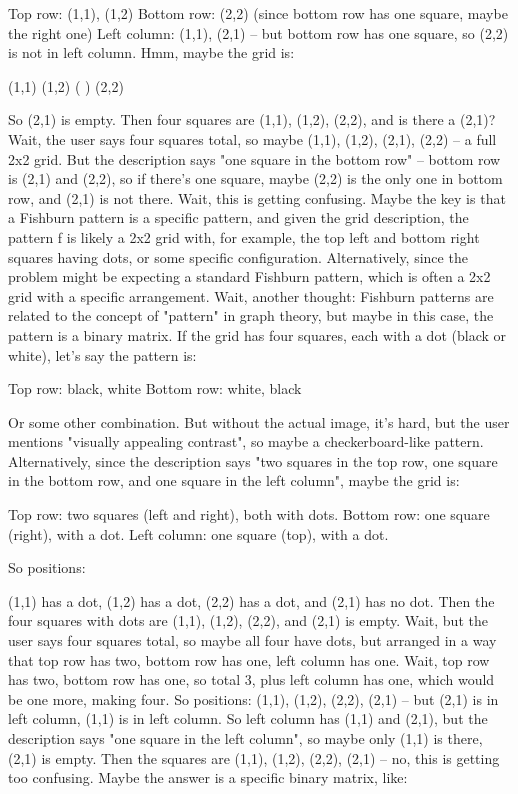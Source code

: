 Top row: (1,1), (1,2)
Bottom row: (2,2) (since bottom row has one square, maybe the right one)
Left column: (1,1), (2,1) – but bottom row has one square, so (2,2) is not in left column. Hmm, maybe the grid is:

(1,1) (1,2)
 ( ) (2,2)

So (2,1) is empty. Then four squares are (1,1), (1,2), (2,2), and is there a (2,1)? Wait, the user says four squares total, so maybe (1,1), (1,2), (2,1), (2,2) – a full 2x2 grid. But the description says "one square in the bottom row" – bottom row is (2,1) and (2,2), so if there's one square, maybe (2,2) is the only one in bottom row, and (2,1) is not there. Wait, this is getting confusing. Maybe the key is that a Fishburn pattern is a specific pattern, and given the grid description, the pattern f is likely a 2x2 grid with, for example, the top left and bottom right squares having dots, or some specific configuration. Alternatively, since the problem might be expecting a standard Fishburn pattern, which is often a 2x2 grid with a specific arrangement. Wait, another thought: Fishburn patterns are related to the concept of "pattern" in graph theory, but maybe in this case, the pattern is a binary matrix. If the grid has four squares, each with a dot (black or white), let's say the pattern is:

Top row: black, white
Bottom row: white, black

Or some other combination. But without the actual image, it's hard, but the user mentions "visually appealing contrast", so maybe a checkerboard-like pattern. Alternatively, since the description says "two squares in the top row, one square in the bottom row, and one square in the left column", maybe the grid is:

Top row: two squares (left and right), both with dots.
Bottom row: one square (right), with a dot.
Left column: one square (top), with a dot.

So positions:

(1,1) has a dot, (1,2) has a dot, (2,2) has a dot, and (2,1) has no dot. Then the four squares with dots are (1,1), (1,2), (2,2), and (2,1) is empty. Wait, but the user says four squares total, so maybe all four have dots, but arranged in a way that top row has two, bottom row has one, left column has one. Wait, top row has two, bottom row has one, so total 3, plus left column has one, which would be one more, making four. So positions: (1,1), (1,2), (2,2), (2,1) – but (2,1) is in left column, (1,1) is in left column. So left column has (1,1) and (2,1), but the description says "one square in the left column", so maybe only (1,1) is there, (2,1) is empty. Then the squares are (1,1), (1,2), (2,2), (2,1) – no, this is getting too confusing. Maybe the answer is a specific binary matrix, like:

